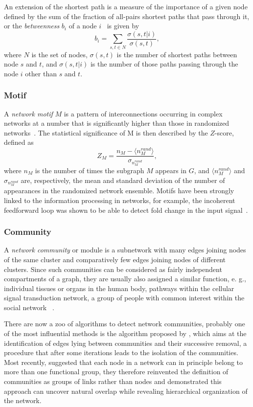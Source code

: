 An extension of the shortest path is a measure of the importance of a given 
node defined by the sum of the fraction of all-pairs shortest paths that pass 
through it, or the 
\emph{betweenness} $b_i$ of a node $i$~\citep{Freeman1977} is given by
\begin{equation}
b_i = \sum_{s,t \in N} \frac{\sigma(s,t|i)}{\sigma(s,t)},
\end{equation}
where $N$ is the set of nodes, $\sigma(s,t)$ is the number of shortest paths 
between node $s$ and $t$, and $\sigma(s,t|i)$ is the number of those paths 
passing through the node $i$ other than $s$ and $t$.

\subsubsection{Motif}
A \emph{network motif} $M$ is a pattern of interconnections occurring in complex 
networks at a number that is significantly higher than those in randomized 
networks~\citep{Milo2002,Shen-Orr2002}. The statistical significance of M is 
then described by the $Z$-score, defined as
\begin{equation}
Z_M = \frac{n_M - \langle n_M^{rand} \rangle}{\sigma_{n_M^{rand}}},
\end{equation}
where $n_M$ is the number of times the subgraph $M$ appears in $G$, and 
$\langle n_M^{rand} \rangle$ and $\sigma_{n_M^{rand}}$ are, respectively, 
the mean and 
standard deviation of the number of appearances in the randomized network ensemble.
Motifs have been strongly linked to the information processing in networks, 
for example, the incoherent feedforward loop was shown to be able to detect
fold change in the input signal~\citep{Goentoro2009}.

\subsubsection{Community}
A \emph{network community} or module is a subnetwork with many edges joining
nodes of the same cluster and comparatively few edges joining nodes of 
different clusters. Since such communities can be considered as fairly 
independent compartments of a graph, they are usually also assigned 
a similar function, e. g., individual tissues or organs in the human body,
pathways within the cellular signal transduction network, a group of people
with common interest within the social network~%
\citep{Fortunato2010,Newman2012}.

There are now a zoo of algorithms to detect network communities, probably one
of the most influential methods is the algorithm proposed by \cite{Girvan2002},
which aims at the identification of edges lying between communities and their 
successive removal, a procedure that after some iterations
leads to the isolation of the communities. Most recently, \cite{Ahn2010b} 
suggested that each node in a network can in principle belong to more than 
one functional group, they therefore reinvented the definition of communities 
as groups of links rather than nodes and demonstrated this approach can uncover
natural overlap while revealing hierarchical organization of the network.

